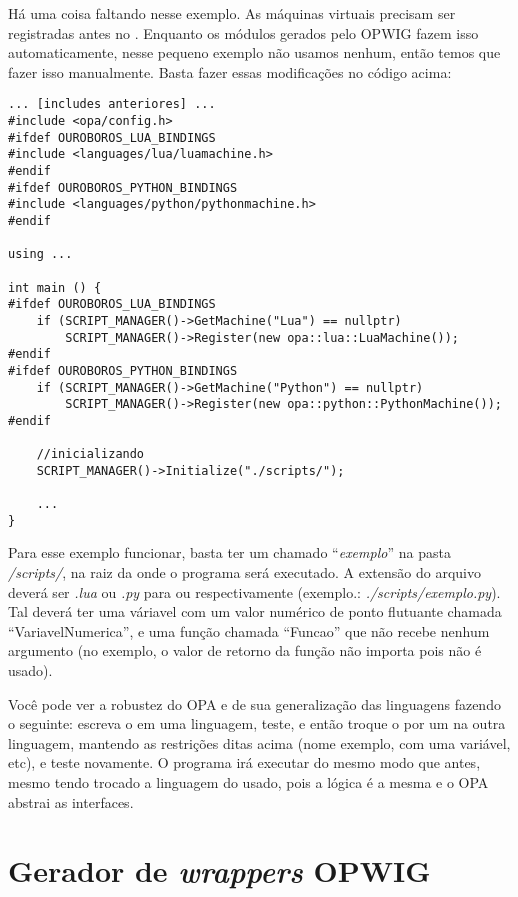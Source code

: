 Há uma coisa faltando nesse exemplo. As máquinas virtuais precisam ser registradas antes no \SMgr{}.
Enquanto os módulos gerados pelo OPWIG fazem isso automaticamente, nesse pequeno exemplo não
usamos nenhum, então temos que fazer isso manualmente. Basta fazer essas modificações no código acima:

\begin{lstlisting}
... [includes anteriores] ...
#include <opa/config.h>
#ifdef OUROBOROS_LUA_BINDINGS
#include <languages/lua/luamachine.h>
#endif
#ifdef OUROBOROS_PYTHON_BINDINGS
#include <languages/python/pythonmachine.h>
#endif

using ...

int main () {
#ifdef OUROBOROS_LUA_BINDINGS
    if (SCRIPT_MANAGER()->GetMachine("Lua") == nullptr)
        SCRIPT_MANAGER()->Register(new opa::lua::LuaMachine());    
#endif
#ifdef OUROBOROS_PYTHON_BINDINGS
    if (SCRIPT_MANAGER()->GetMachine("Python") == nullptr)
        SCRIPT_MANAGER()->Register(new opa::python::PythonMachine());
#endif

    //inicializando
    SCRIPT_MANAGER()->Initialize("./scripts/");
    
    ...
}
\end{lstlisting}

Para esse exemplo funcionar, basta ter um \script{} chamado ``\textit{exemplo}''
na pasta \textit{/scripts/}, na raiz da onde o programa será executado. A extensão
do arquivo deverá ser \textit{.lua} ou \textit{.py} para  ou  respectivamente
(exemplo.: \textit{./scripts/exemplo.py}). Tal \script{} deverá ter uma váriavel
com um valor numérico de ponto flutuante chamada ``VariavelNumerica'', e uma função
chamada ``Funcao'' que não recebe nenhum argumento (no exemplo, o valor de retorno da
função não importa pois não é usado).

Você pode ver a robustez do OPA e de sua generalização das linguagens fazendo o seguinte:
escreva o \script{} em uma linguagem, teste, e então troque o \script{} por um na
outra linguagem, mantendo as restrições ditas acima (nome exemplo,  com uma variável, etc),
e teste novamente. O programa irá executar do mesmo modo que antes, mesmo tendo trocado a
linguagem do \script{} usado, pois a lógica é a mesma e o OPA abstrai as interfaces.


\section{Gerador de \emph{wrappers} \textbf{OPWIG}}
\label{sec:resultados:opwig}


